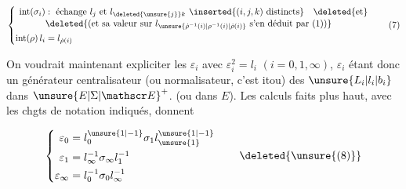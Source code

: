 \[
\left\{\begin{aligned}
\mathrm{int}(\sigma_i)&:\ \text{échange } l_j \text{ et }l_{\deleted{\unsure{j}}k}
 \ \inserted{(i,j,k)\ \text{distincts}}\quad\deleted{\text{et}}\\[-2pt]
&\deleted{\text{(et sa valeur sur }l_{\unsure{\dot\rho^{-1}(i)|\rho^{-1}(i)|\dot\rho(i)}}\text{ s'en déduit par (1))}}\\
\mathrm{int}(\rho)\,l_i&=l_{\dot\rho(i)}
\end{aligned}\right. \tag*{(7)}
\]

On voudrait maintenant expliciter les $\varepsilon_i$ avec $\varepsilon_i^2=l_i$ $(i=0,1,\infty)$, $\varepsilon_i$ étant donc un générateur  centralisateur (ou normalisateur, c'est itou) des $\unsure{L_i|l_i|b_i}$ dans ${\unsure{E|\Sigma|\mathscr E}}^+$. (ou  dans $E$). Les calculs faits plus haut, avec les chgts de notation indiqués, donnent

\[
\left\{\begin{aligned}
\varepsilon_0&=l_0^{\unsure{1|-1}}\sigma_1l_{\unsure{1}}^{\unsure{1|-1}}\\
\varepsilon_1&=l_\infty^{-1}\sigma_\infty l_1^{-1}\\
\varepsilon_\infty&=l_0^{-1}\sigma_0 l_\infty^{-1}
\end{aligned}\right. \tag*{\deleted{\unsure{(8)}}}
\]
